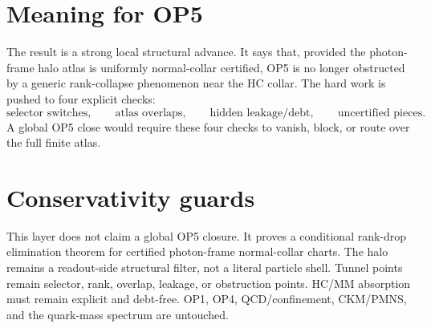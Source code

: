 \section{Meaning for OP5}

The result is a strong local structural advance. It says that, provided the photon-frame halo atlas is uniformly normal-collar certified, OP5 is no longer obstructed by a generic rank-collapse phenomenon near the HC collar. The hard work is pushed to four explicit checks:
\[
\text{selector switches},\qquad
\text{atlas overlaps},\qquad
\text{hidden leakage/debt},\qquad
\text{uncertified pieces}.
\]
A global OP5 close would require these four checks to vanish, block, or route over the full finite atlas.

\section{Conservativity guards}

This layer does not claim a global OP5 closure. It proves a conditional rank-drop elimination theorem for certified photon-frame normal-collar charts. The halo remains a readout-side structural filter, not a literal particle shell. Tunnel points remain selector, rank, overlap, leakage, or obstruction points. HC/MM absorption must remain explicit and debt-free. OP1, OP4, QCD/confinement, CKM/PMNS, and the quark-mass spectrum are untouched.



\clearpage
